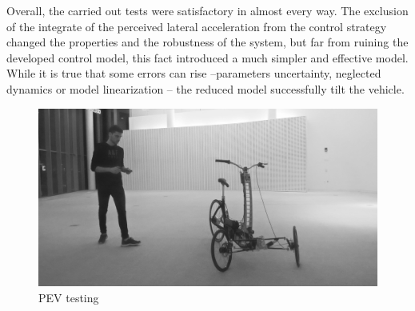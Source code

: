 Overall, the carried out tests were satisfactory in almost every way. The exclusion of  the integrate of the perceived lateral acceleration from the control strategy changed the properties and the robustness of the system, but far from ruining the developed control model, this fact introduced a much simpler and effective model. While it is true that some errors can rise --parameters uncertainty, neglected dynamics or model linearization -- the reduced model successfully tilt the vehicle. 


\begin{figure}[b]
	\includegraphics[width=1\linewidth]{figs/06/test_2}
	\caption{PEV testing}
\end{figure}



